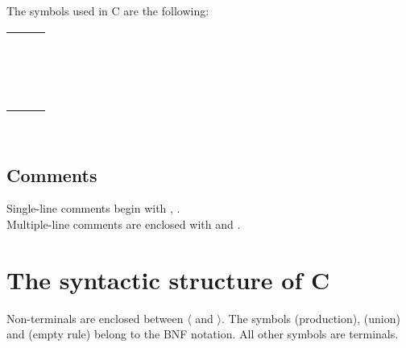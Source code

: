 \documentclass[a4paper,11pt]{article}
\begin{document}
The symbols used in C are the following: \\

\begin{tabular}{lll}
{\symb{;}} &{\symb{,}} &{\symb{{$=$}}} \\
{\symb{\{}} &{\symb{\}}} &{\symb{:}} \\
{\symb{(}} &{\symb{)}} &{\symb{[}} \\
{\symb{]}} &{\symb{*}} &{\symb{...}} \\
{\symb{?}} &{\symb{{$|$}{$|$}}} &{\symb{\&\&}} \\
{\symb{{$|$}}} &{\symb{\^}} &{\symb{\&}} \\
{\symb{{$=$}{$=$}}} &{\symb{!{$=$}}} &{\symb{{$<$}}} \\
{\symb{{$>$}}} &{\symb{{$<$}{$=$}}} &{\symb{{$>$}{$=$}}} \\
{\symb{{$<$}{$<$}}} &{\symb{{$>$}{$>$}}} &{\symb{{$+$}}} \\
{\symb{{$-$}}} &{\symb{/}} &{\symb{\%}} \\
{\symb{{$+$}{$+$}}} &{\symb{{$-$}{$-$}}} &{\symb{.}} \\
{\symb{{$-$}{$>$}}} &{\symb{\~{}}} &{\symb{!}} \\
{\symb{*{$=$}}} &{\symb{/{$=$}}} &{\symb{\%{$=$}}} \\
{\symb{{$+$}{$=$}}} &{\symb{{$-$}{$=$}}} &{\symb{{$<$}{$<$}{$=$}}} \\
{\symb{{$>$}{$>$}{$=$}}} &{\symb{\&{$=$}}} &{\symb{\^{$=$}}} \\
{\symb{{$|$}{$=$}}} & & \\
\end{tabular}\\

\subsection*{Comments}
Single-line comments begin with {\symb{//}}, {\symb{\#}}. \\Multiple-line comments are  enclosed with {\symb{/*}} and {\symb{*/}}.

\section*{The syntactic structure of C}
Non-terminals are enclosed between $\langle$ and $\rangle$. 
The symbols  {\arrow}  (production),  {\delimit}  (union) 
and {\emptyP} (empty rule) belong to the BNF notation. 
All other symbols are terminals.\\
\end{document}
